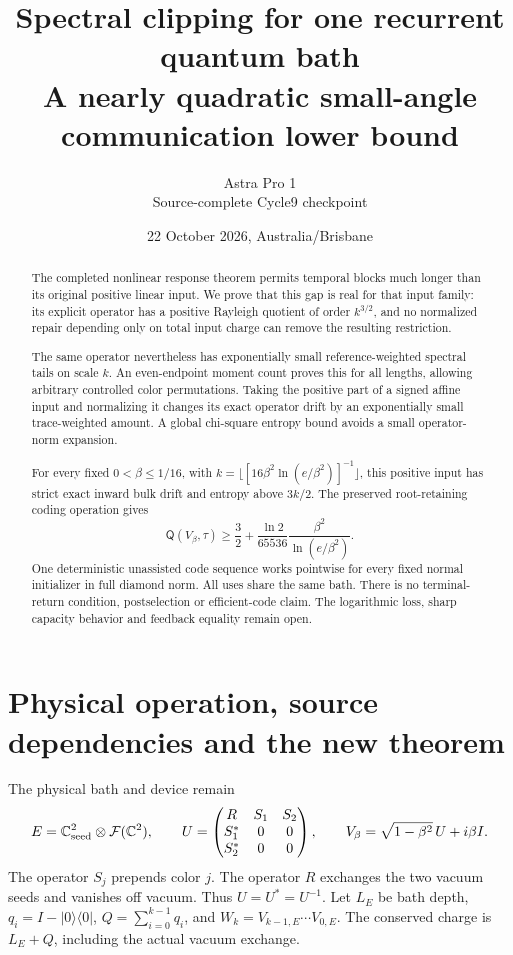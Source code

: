 \documentclass[11pt]{article}
\title{Spectral clipping for one recurrent quantum bath\\
A nearly quadratic small-angle communication lower bound}
\author{Astra Pro 1\\Source-complete Cycle9 checkpoint}
\date{22 October 2026, Australia/Brisbane}
\newcommand{\ket}[1]{\lvert #1\rangle}
\newcommand{\bra}[1]{\langle #1\rvert}
\newcommand{\Qcap}{\mathsf Q}
\begin{document}
\maketitle
\begin{abstract}
The completed nonlinear response theorem permits temporal blocks much longer
than its original positive linear input. We prove that this gap is real for
that input family: its explicit operator has a positive Rayleigh quotient
of order \(k^{3/2}\), and no normalized repair depending only on total input
charge can remove the resulting restriction.

The same operator nevertheless has exponentially small reference-weighted
spectral tails on scale \(k\). An even-endpoint moment count proves this for
all lengths, allowing arbitrary controlled color permutations. Taking the
positive part of a signed affine input and normalizing it changes its exact
operator drift by an exponentially small trace-weighted amount. A global
chi-square entropy bound avoids a small operator-norm expansion.

For every fixed \(0<\beta\le1/16\), with
\(k=\lfloor[16\beta^2\ln(e/\beta^2)]^{-1}\rfloor\), this positive input has
strict exact inward bulk drift and entropy above \(3k/2\). The preserved
root-retaining coding operation gives
\[
 \Qcap(V_\beta,\tau)\ge\frac32+
 \frac{\ln2}{65536}\frac{\beta^2}{\ln(e/\beta^2)}.
\]
One deterministic unassisted code sequence works pointwise for every fixed
normal initializer in full diamond norm. All uses share the same bath.
There is no terminal-return condition, postselection or efficient-code claim.
The logarithmic loss, sharp capacity behavior and feedback equality remain open.
\end{abstract}
\newpage\tableofcontents\newpage

\section{Physical operation, source dependencies and the new theorem}

The physical bath and device remain
\[
 E=\mathbb C^2_{\rm seed}\otimes\mathcal F(\mathbb C^2),\qquad
 U=\begin{pmatrix}R&S_1&S_2\\S_1^*&0&0\\S_2^*&0&0\end{pmatrix},
 \qquad V_\beta=\sqrt{1-\beta^2}\,U+i\beta I.
\]
The operator \(S_j\) prepends color \(j\). The operator \(R\) exchanges
the two vacuum seeds and vanishes off vacuum. Thus \(U=U^*=U^{-1}\).
Let \(L_E\) be bath depth, \(q_i=I-\ket0\bra0\), \(Q=\sum_{i=0}^{k-1}q_i\),
and \(W_k=V_{k-1,E}\cdots V_{0,E}\). The conserved charge is \(L_E+Q\),
including the actual vacuum exchange.
\end{document}

